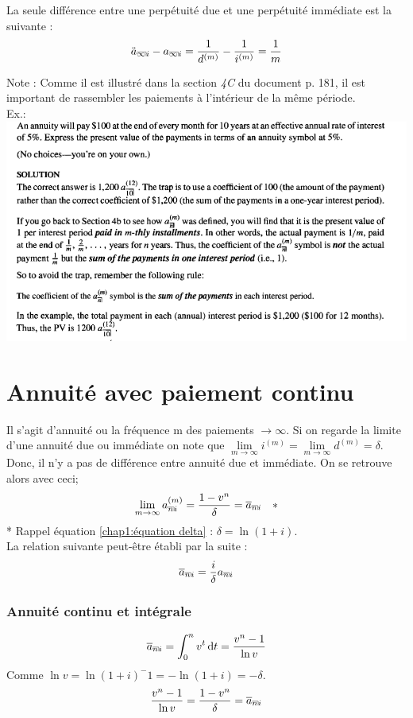 \documentclass[11pt,french]{report}
\makeatletter
\DeclareRobustCommand{\annuity}[1]{%
\def\arraystretch{0}%
\setlength\arraycolsep{.7pt}%
\setlength\arrayrulewidth{.3pt}%
\begin{array}[b]{@{}c|}\hline
\\[\arraycolsep]%
\scriptstyle #1%
\end{array}%
}
\makeatother
\begin{document}
La seule différence entre une perpétuité due et une perpétuité immédiate est la suivante :
\begin{equation}
\ddot{a}_{\annuity{\infty}i} - a_{\annuity{\infty}i} = \frac{1}{d^{(m)}} - \frac{1}{i^{(m)}} = \frac{1}{m}
\end{equation}

Note : Comme il est illustré dans la section \emph{4C} du document p. 181, il est important de rassembler les paiements à l'intérieur de la même période. 
\\Ex.:
\\\includegraphics[scale=0.55]{picture5.PNG}

\section{Annuité avec paiement continu}
\label{Annuité continu}

Il s'agit d'annuité ou la fréquence m des paiements $\longrightarrow \infty$. Si on regarde la limite d'une annuité due ou immédiate on note que $\lim\limits_{m \to \infty } i^{(m)} = \lim\limits_{m \to \infty } d^{(m)} = \delta$. Donc, il n'y a pas de différence entre annuité due et immédiate. On se retrouve alors avec ceci;
\begin{equation}
\lim\limits_{m \to \infty } a_{\annuity{n}i}^{(m)} = \frac{1 - v^n}{\delta} = \overline{a}_{\annuity{n}i} \quad *
\end{equation}
* Rappel équation \ref{chap1:équation delta} : $\delta = \ln(1+i)$.
\\La relation suivante peut-être établi par la suite :  
\begin{equation}
\overline{a}_{\annuity{n}i} = \frac{i}{\delta}a_{\annuity{n}i}
\end{equation}  

\subsubsection{Annuité continu et intégrale}
\label{sub:sub:continu et integrale}
\begin{equation}
\overline{a}_{\annuity{n}i} = \int_{0}^{n} v^{t} \, \mathrm{d}t = \frac{v^{n} - 1}{\ln v}
\end{equation}
Comme $\ln v = \ln(1+i)^-1 = - \ln(1+i) = - \delta $.
\begin{equation}
\frac{v^{n} - 1}{\ln v} = \frac{1 - v^{n}}{\delta} = \overline{a}_{\annuity{n}i}
\end{equation}
\end{document}

